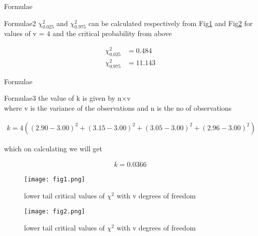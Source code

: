 \documentclass{beamer}
\providecommand{\brak}[1]{\ensuremath{\left(#1\right)}}
\begin{document}
\begin{frame}{Formulae}
    \begin{block}{Formulae2}
         $\chi^{2}_{0.025}$ and $\chi^{2}_{0.975}$ can be calculated respectively from Fig\ref{fig:my_label1} and Fig\ref{fig:my_label2} for values of v = $4$ and the critical probability from above 
         
         \begin{align}
             \chi^{2}_{0.025} &= 0.484  \\
             \chi^{2}_{0.975} &= 11.143
         \end{align}
         
    \end{block}
\end{frame}



\begin{frame}{Formulae}
    \begin{block}{Formulae3}
       the value of k is given by n$\times$v \\
       where v is the variance of the observations and n is the no of observations
       
       \begin{align*}
           k= 4\brak{ (2.90 - 3.00)^{2} + (3.15 - 3.00)^{2} + (3.05 - 3.00)^{2} + (2.96 - 3.00)^{2} }
       \end{align*}
       
       which on calculating we will get 
       
       \begin{align}
           k = 0.0366
       \end{align}
       
    \end{block}
\end{frame}



\begin{frame}

     \begin{figure}
           \centering
           \texttt{[image: fig1.png]}
           \caption{ lower tail critical values of ${\chi}^{2}$ with v degrees of freedom }
           \label{fig:my_label1}
      \end{figure}
      
\end{frame}



\begin{frame}

     \begin{figure}
           \centering
           \texttt{[image: fig2.png]}
           \caption{{ lower tail critical values of ${\chi}^{2}$ with v degrees of freedom }}
           \label{fig:my_label2}
      \end{figure}
      
\end{frame}
\end{document}
